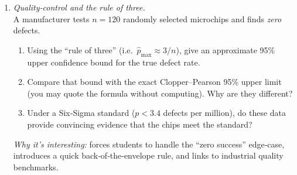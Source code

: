 \documentclass[11pt]{article}
\begin{document}
\begin{enumerate}[label=\textbf{Q\,\arabic*:}, start=6, left=0pt]
\item  \emph{Quality‑control and the rule of three.}  \\
      A manufacturer tests $n=120$ randomly selected microchips and finds \emph{zero} defects.
      \begin{enumerate}[label=(\alph*)]
          \item Using the “rule of three” (i.e.\ $\hat{p}_{\max}\approx 3/n$), give an approximate 95\% upper confidence bound for the true defect rate.
          \item Compare that bound with the exact Clopper–Pearson 95\% upper limit (you may quote the formula without computing).  Why are they different?
          \item Under a Six‑Sigma standard ($p<3.4$ defects per million), do these data provide convincing evidence that the chips meet the standard?
      \end{enumerate}
      \textit{Why it’s interesting:} forces students to handle the “zero success” edge‑case, introduces a quick back‑of‑the‑envelope rule, and links to industrial quality benchmarks.

\end{enumerate}
\end{document}
